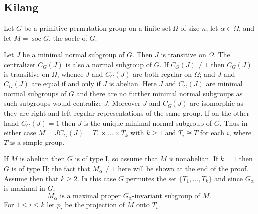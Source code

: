 \subsection{Kilang}
Let $G$ be a primitive permutation group on a finite set $\Omega$ of size $n$, let $\alpha \in \Omega$, and let $M = \operatorname{soc} G$, the socle of $G$.

Let $J$ be a minimal normal subgroup of $G$. Then $J$ is transitive on $\Omega$. The centralizer $C_G(J)$ is also a normal subgroup of $G$. If $C_G(J) \neq 1$ then $C_G(J)$ is transitive on $\Omega$, whence $J$ and $C_G(J)$ are both regular on $\Omega$; and $J$ and $C_G(J)$ are equal if and only if $J$ is abelian. Here $J$ and $C_G(J)$ are minimal normal subgroups of $G$ and there are no further minimal normal subgroups as such subgroups would centralize $J$. Moreover $J$ and $C_G(J)$ are isomorphic as they are right and left regular representations of the same group. If on the other hand $C_G(J)=1$ then $J$ is the unique minimal normal subgroup of $G$. Thus in either case $M = J C_G(J) = T_1 \times \dots \times T_k$ with $k \ge 1$ and $T_i \cong T$ for each $i$, where $T$ is a simple group.

If $M$ is abelian then $G$ is of type I, so assume that $M$ is nonabelian. If $k=1$ then $G$ is of type II; the fact that $M_\alpha \neq 1$ here will be shown at the end of the proof. Assume then that $k \ge 2$. In this case $G$ permutes the set $\{T_1, \dots, T_k\}$ and since $G_\alpha$ is maximal in $G$,
\begin{equation}
	M_\alpha \text{ is a maximal proper } G_\alpha \text{-invariant subgroup of } M.
\end{equation}
For $1 \le i \le k$ let $p_i$ be the projection of $M$ onto $T_i$.

